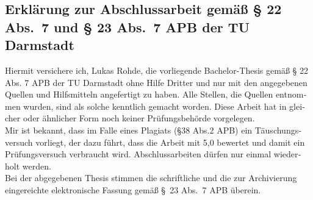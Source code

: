 \documentclass[11pt,longdoc,accentcolor=tud1b,paper=a4]{tuddesign/tudreport}
\title{\komTitle}
\newcommand{\komThesisType}{Bachelor-Thesis\xspace}
\newcommand{\komName}{Lukas Rohde\xspace}
\begin{document}
	
	\frenchspacing
	\raggedbottom
	\maketitle
	
	
    
    \begin{otherlanguage}{ngerman}
    
    \chapter*{Erklärung zur Abschlussarbeit gemäß § 22 Abs.\ 7 und § 23 Abs.\ 7 APB der TU Darmstadt}	 
    
    Hiermit versichere ich, \komName, die vorliegende \komThesisType gemäß § 22 Abs. 7 APB der TU Darmstadt ohne Hilfe Dritter und nur mit den angegebenen Quellen und Hilfsmitteln angefertigt zu haben.
    Alle Stellen, die Quellen entnommen wurden, sind als solche kenntlich gemacht worden. 
    Diese Arbeit hat in gleicher oder ähnlicher Form noch keiner Prüfungsbehörde vorgelegen. \\
   
	\noindent Mir ist bekannt, dass im Falle eines Plagiats (§38 Abs.2 APB) ein Täuschungsversuch vorliegt, der dazu führt, dass die Arbeit mit 5,0 bewertet und damit ein Prüfungsversuch verbraucht wird. 
	Abschlussarbeiten dürfen nur einmal wiederholt werden.\\

	\noindent Bei der abgegebenen Thesis stimmen die schriftliche und die zur Archivierung eingereichte elektronische Fassung gemäß §~23 Abs.~7 APB überein. \\

\end{otherlanguage}
\end{document}
